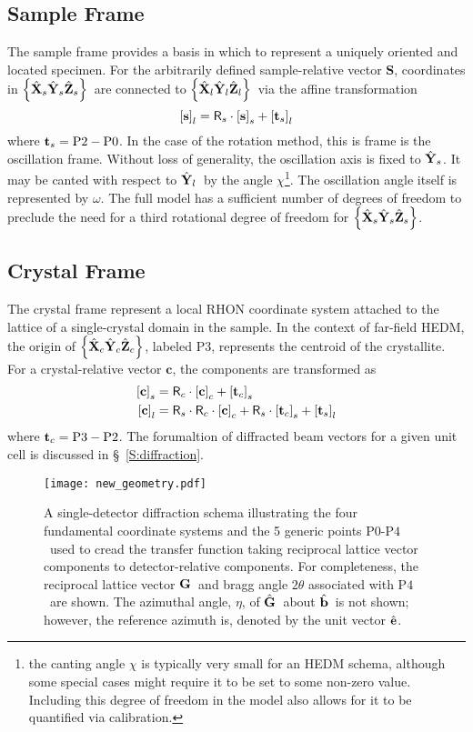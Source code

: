 \documentclass[12pt,letterpaper,final]{amsart}
\newcommand{\mbm}[1]{\ensuremath{\mbox{\boldmath$#1$}}}
\newcommand{\tvecs}{\ensuremath{\mbm{\mathrm{t}}_s}}
\newcommand{\tvecc}{\ensuremath{\mbm{\mathrm{t}}_c}}
\newcommand{\rmats}{\ensuremath{\mathsf{R}_s}}
\newcommand{\rmatc}{\ensuremath{\mathsf{R}_c}}
\newcommand{\gvec}{\ensuremath{\mbm{\mathrm{G}}}}
\newcommand{\ghat}{\ensuremath{\hat{\mbm{\mathrm{G}}}}}
\newcommand{\bhat}{\ensuremath{\hat{\mbm{\mathrm{b}}}}}
\newcommand{\ehat}{\ensuremath{\hat{\mbm{\mathrm{e}}}}}
\newcommand{\Pzero}{\ensuremath{\mathrm{P0}}}
\newcommand{\Ptwo}{\ensuremath{\mathrm{P2}}}
\newcommand{\Pthree}{\ensuremath{\mathrm{P3}}}
\newcommand{\Pfour}{\ensuremath{\mathrm{P4}}}
\newcommand{\Xl}{\ensuremath{\hat{\mbm{\mathrm{X}}}_l}}
\newcommand{\Yl}{\ensuremath{\hat{\mbm{\mathrm{Y}}}_l}}
\newcommand{\Zl}{\ensuremath{\hat{\mbm{\mathrm{Z}}}_l}}
\newcommand{\labframe}{\ensuremath{\left\{\Xl\Yl\Zl\right\}}}
\newcommand{\Xs}{\ensuremath{\hat{\mbm{\mathrm{X}}}_s}}
\newcommand{\Ys}{\ensuremath{\hat{\mbm{\mathrm{Y}}}_s}}
\newcommand{\Zs}{\ensuremath{\hat{\mbm{\mathrm{Z}}}_s}}
\newcommand{\samframe}{\ensuremath{\left\{\Xs\Ys\Zs\right\}}}
\newcommand{\Xc}{\ensuremath{\hat{\mbm{\mathrm{X}}}_c}}
\newcommand{\Yc}{\ensuremath{\hat{\mbm{\mathrm{Y}}}_c}}
\newcommand{\Zc}{\ensuremath{\hat{\mbm{\mathrm{Z}}}_c}}
\newcommand{\xtlframe}{\ensuremath{\left\{\Xc\Yc\Zc\right\}}}
\newcommand{\labcomps}[1]{\left[#1\right]_l}
\newcommand{\samcomps}[1]{\left[#1\right]_s}
\newcommand{\xtlcomps}[1]{\left[#1\right]_c}
\newcommand{\secref}[1]{\S~\ref{#1}}
\begin{document}
\subsection{Sample Frame}\label{S:sample}
The sample frame provides a basis in which to represent a uniquely
oriented and located specimen.  For the arbitrarily defined
sample-relative vector $\mathbf{S}$, coordinates in \samframe\ are
connected to \labframe\ via the affine transformation
\begin{equation}
  \labcomps{\mathbf{s}} = \rmats\cdot\samcomps{\mathbf{s}} + \labcomps{\tvecs}  
\end{equation}
where $\tvecs=\Ptwo-\Pzero$.  In the case of the rotation method, this
is frame is the oscillation frame.  Without loss of generality, the
oscillation axis is fixed to \Ys.  It may be canted with respect to
\Yl\ by the angle $\chi$\footnote{the canting angle $\chi$ is
  typically very small for an HEDM schema, although some special cases
  might require it to be set to some non-zero value.  Including this
  degree of freedom in the model also allows for it to be quantified
  via calibration.}.  The oscillation angle itself is represented by
$\omega$.  The full model has a sufficient number of degrees of
freedom to preclude the need for a third rotational degree of freedom
for \samframe.

\subsection{Crystal Frame}\label{S:crystal}
The crystal frame represent a local RHON coordinate system attached to
the lattice of a single-crystal domain in the sample.  In the context
of far-field HEDM, the origin of \xtlframe, labeled \Pthree,
represents the centroid of the crystallite.  For a crystal-relative
vector $\mathbf{c}$, the components are transformed as
\begin{align}
  \samcomps{\mathbf{c}} &= \rmatc\cdot\xtlcomps{\mathbf{c}} + \samcomps{\tvecc}\\
  \labcomps{\mathbf{c}} &= \rmats\cdot\rmatc\cdot\xtlcomps{\mathbf{c}} + \rmats\cdot\samcomps{\tvecc} + \labcomps{\tvecs}
\end{align}
where $\tvecc=\Pthree-\Ptwo$.  The forumaltion of diffracted beam vectors for a given unit cell is discussed in \secref{S:diffraction}.
\begin{figure}[htb]
  \centering
  \texttt{[image: new\_geometry.pdf]}
  \caption{A single-detector diffraction schema illustrating the four fundamental coordinate systems and the 5 generic points \Pzero-\Pfour\ used to cread the transfer function taking reciprocal lattice vector components to detector-relative components.  For completeness, the reciprocal lattice vector \gvec\ and bragg angle $2\theta$ associated with \Pfour\ are shown.  The azimuthal angle, $\eta$, of \ghat\ about \bhat\ is not shown; however, the reference azimuth is, denoted by the unit vector \ehat. }
  \label{F:diffraction_schema}
\end{figure}
\end{document}
